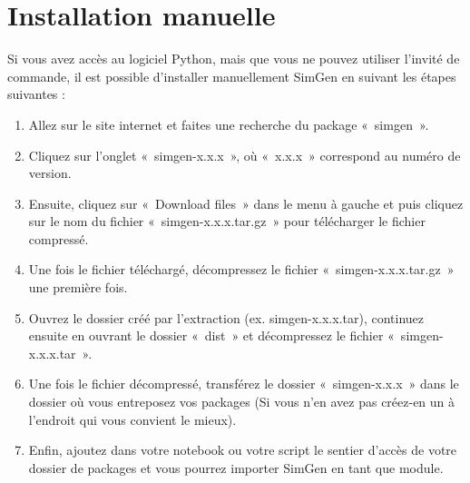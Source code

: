\documentclass[letterpaper,10pt,french]{sphinxmanual}
\begin{document}
\section{Installation manuelle}
\label{\detokenize{installation:installation-manuelle}}
Si vous avez accès au logiciel Python, mais que vous ne pouvez utiliser l’invité de commande,
il est possible d’installer manuellement SimGen en suivant les étapes suivantes :
\begin{enumerate}
%
\item {} 
Allez sur le site internet  et faites une recherche du package « simgen ».

\item {} 
Cliquez sur l’onglet « simgen-x.x.x », où « x.x.x » correspond au numéro de version.

\item {} 
Ensuite, cliquez sur « Download files » dans le menu à gauche et puis cliquez sur le nom du fichier « simgen-x.x.x.tar.gz » pour télécharger le fichier compressé.

\item {} 
Une fois le fichier téléchargé, décompressez le fichier « simgen-x.x.x.tar.gz » une première fois.

\item {} 
Ouvrez le dossier créé par l’extraction (ex. simgen-x.x.x.tar), continuez ensuite en ouvrant le dossier « dist » et décompressez le fichier « simgen-x.x.x.tar ».

\item {} 
Une fois le fichier décompressé, transférez le dossier « simgen-x.x.x » dans le dossier où vous entreposez vos packages (Si vous n’en avez pas créez-en un à l’endroit qui vous convient le mieux).

\item {} 
Enfin, ajoutez dans votre notebook ou votre script le sentier d’accès de votre dossier de packages et vous pourrez importer SimGen en tant que module.

\end{enumerate}

\begin{sphinxVerbatim}[commandchars=\\\{\}]
 

 
\end{sphinxVerbatim}
\end{document}
